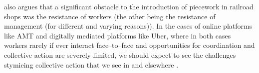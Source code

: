 \documentclass[trackingWork]{subfiles}
\begin{document}
{\citeauthor{10.2307/23702539} also argues that
a significant obstacle to the introduction of piecework in railroad shops was
the resistance of workers
(the other being the resistance of management (for different and varying reasons)).
In the cases of online platforms like AMT and digitally mediated platforms like Uber,
where in both cases workers rarely
if ever
interact face--to--face and
opportunities for coordination and collective action are severely limited,
we should expect to see
the challenges stymieing collective action
that we see in \citeauthor{dynamo} and elsewhere
\cite{10.2307/23702539,dynamo}.

}


\onlyinsubfile{
  \balance{}
  \printbibliography
}
\end{document}
